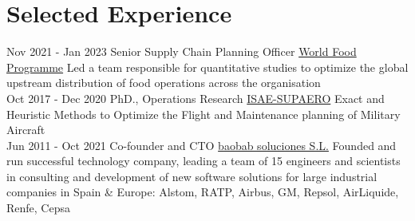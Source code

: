 \documentclass[letterpaper]{twentysecondcv} %
\begin{document}
\makeprofile %


\section{Selected Experience}

\begin{twenty} %
\twentyitem
      {Nov 2021 -}
    {Jan 2023}
        {Senior Supply Chain Planning Officer}
        {\href{http://www.wfp.org/}{World Food Programme}}
        {}
        {Led a team responsible for quantitative studies to optimize the global upstream distribution of food operations across the organisation
        }
        \\
\twentyitem
    	{Oct 2017 -}
		{Dec 2020}
        {PhD., Operations Research}
        {\href{https://www.isae-supaero.fr/en/}{ISAE-SUPAERO}}
        {}
        {Exact and Heuristic Methods to Optimize the Flight and Maintenance planning of Military Aircraft
        }
        \\
	\twentyitem
    	{Jun 2011 -}
		{Oct 2021}
        {Co-founder and CTO}
        {\href{https://baobabsoluciones.es/en/}{baobab soluciones S.L.}}
        {}
        {Founded and run successful technology company, leading a team of 15 engineers and scientists in consulting and development of new software solutions for large industrial companies in Spain \& Europe: Alstom, RATP, Airbus, GM, Repsol, AirLiquide, Renfe, Cepsa
        }
\end{twenty}
\end{document}
